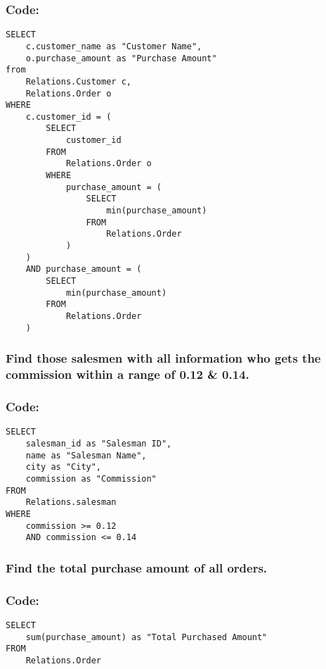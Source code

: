 \documentclass[12pt]{article}
\begin{document}
\subsubsection*{Code: }
\begin{verbatim}
SELECT
    c.customer_name as "Customer Name",
    o.purchase_amount as "Purchase Amount"
from
    Relations.Customer c,
    Relations.Order o
WHERE
    c.customer_id = (
        SELECT
            customer_id
        FROM
            Relations.Order o
        WHERE
            purchase_amount = (
                SELECT
                    min(purchase_amount)
                FROM
                    Relations.Order
            )
    )
    AND purchase_amount = (
        SELECT
            min(purchase_amount)
        FROM
            Relations.Order
    )
\end{verbatim}

\vspace{10mm}

\subsubsection{Find those salesmen with all information who gets the commission within a range of 0.12 \& 0.14.}
\subsubsection*{Code: }
\begin{verbatim}
SELECT
    salesman_id as "Salesman ID",
    name as "Salesman Name",
    city as "City",
    commission as "Commission"
FROM
    Relations.salesman
WHERE
    commission >= 0.12
    AND commission <= 0.14
\end{verbatim}
\vspace{10mm}

\subsubsection{Find the total purchase amount of all orders.}
\subsubsection*{Code: }
\begin{verbatim}
SELECT
    sum(purchase_amount) as "Total Purchased Amount"
FROM
    Relations.Order
\end{verbatim}
\vspace{10mm}
\end{document}
